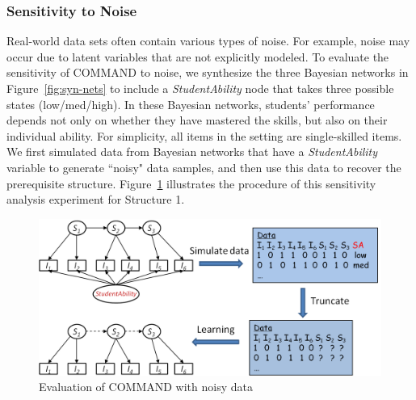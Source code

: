 \documentclass{edm_template}
\newcommand{\hl}[1]{\colorbox{yellow}{#1}}
\begin{document}
	
	\subsubsection{Sensitivity to Noise}	
	
	Real-world data sets often contain various types of noise.
	For example,  noise may occur due to latent variables that are not explicitly modeled. 
	To evaluate the sensitivity of COMMAND to noise, we synthesize the three Bayesian networks in Figure~\ref{fig:syn-nets} to include a \emph{StudentAbility} node 
	that takes three possible states (low/med/high). 
	In these Bayesian networks, students' performance depends not only on whether they have mastered the skills, but also on their individual ability. %
	For simplicity, all items in the setting are single-skilled items. 
	We first simulated data from  Bayesian networks that have a \emph{StudentAbility} variable to generate ``noisy" data samples, and 
	then use this data to recover the prerequisite structure. %
	Figure~\ref{fig:stuabilitymodel} illustrates the procedure of this sensitivity analysis experiment for Structure 1.
	
			\begin{figure}[!ht]
				\begin{center}
					\includegraphics[width=.95\linewidth]{figures/studentability.png}
				\end{center}
				\vspace{-1em}
				\caption{Evaluation of COMMAND with noisy data} 
				\label{fig:stuabilitymodel}
			\end{figure}
			
\end{document}
